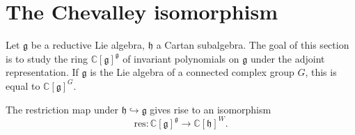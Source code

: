 \section{The Chevalley isomorphism}
\label{section-Chevalley-isomorphism}

Let $\mathfrak g$ be a reductive Lie algebra, $\mathfrak h$ a Cartan subalgebra. The goal of this section is to study the ring $\mathbb C[\mathfrak g]^{\mathfrak g}$ of invariant polynomials on $\mathfrak g$ under the adjoint representation. If $\mathfrak g$ is the Lie algebra of a connected complex group $G$, this is equal to $\mathbb C[\mathfrak g]^G$.



\begin{theorem}
 \label{theorem-Chevalley-isomorphism}
The restriction map under $\mathfrak h \hookrightarrow \mathfrak g$ gives rise to an isomorphism 
 \begin{equation}
  \label{equation-Chevalley-map}
 \text{res}:\mathbb C[\mathfrak g]^{\mathfrak g} \to \mathbb C[\mathfrak h]^W.
 \end{equation}
\end{theorem}

